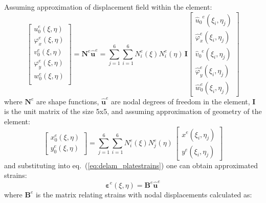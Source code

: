 \documentclass[preprint,12pt]{elsarticle}
\renewcommand{\vec}[1]{\mathbf{#1}}
\renewcommand{\bm}[1]{\mathbf{#1}}
\newcommand{\bs}[1]{\boldsymbol{#1}}
\begin{document}
	Assuming approximation of displacement field within the element:
	\begin{equation}
	\left[\begin{array}{l} u_0^e(\xi, \eta) \\ \varphi_x^e(\xi, \eta)\\ v_0^e(\xi, \eta) \\ \varphi_y^e(\xi, \eta)\\ w_0^e(\xi, \eta)\\ \end{array}\right] = \bm{N}^e \vec{\hat{u}}^e = \sum \limits_{j=1}^{6} \sum \limits_{i=1}^{6} N^e_i(\xi) N^e_i(\eta)\, \bm{I} \left[ \begin{array}{l} {\hat{u}_0}^e(\xi_i,\eta_j)\\\hat{\varphi}_x^e(\xi_i,\eta_j)\\{\hat{v}_0}^e(\xi_i,\eta_j) \\\hat{\varphi}_y^e(\xi_i,\eta_j) \\ \hat{w}_0^e(\xi_i,\eta_j)\end{array} \right]\label{eq:delam_plateaproxim}
	\end{equation}  
	where $\bm{N}^e$ are shape functions, $\vec{\hat{u}}^e$ are nodal degrees of freedom in the element, $\bm{I}$ is the unit matrix of the size 5x5, and assuming approximation of geometry of the element:	\begin{equation}
	\left[\begin{array}{l} x_0^e(\xi, \eta) \\ y_0^e(\xi, \eta)  \end{array}\right] = \sum \limits_{j=1}^{6} \sum \limits_{i=1}^{6} N^e_i(\xi) N^e_j(\eta)\, \left[ \begin{array}{l} x^e(\xi_i,\eta_j)\\y^e(\xi_i,\eta_j)\end{array} \right]\label{eq:delam_plategeom}
	\end{equation}  
	and substituting into eq.~(\ref{eq:delam_platestrains}) one can obtain approximated strains: 
	\begin{equation}
	\bs{\varepsilon}^e(\xi,\eta) = 	\vec{B}^e \vec{\hat{u}}^e \label{eq:delam_plate_relat}
	\end{equation} 
	where $	\vec{B}^e$ is the matrix relating strains with nodal displacements calculated as:
\end{document}
